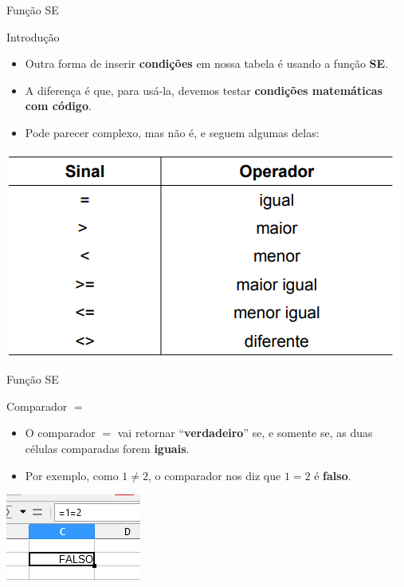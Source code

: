 \begin{frame}{Função SE}
	\begin{block}{Introdução}
		\begin{itemize}
			\item Outra forma de inserir \textbf{condições} em nossa tabela é usando a função \textbf{SE}.
			\item A diferença é que, para usá-la, devemos testar \textbf{condições matemáticas com código}.
			\item Pode parecer complexo, mas não é, e seguem algumas delas:
		\end{itemize}
	\end{block}
	
	\centering
	\includegraphics[width=0.6\linewidth]{Figuras/Ch06/fig44.12}
\end{frame}


\begin{frame}{Função SE}
	\begin{block}{Comparador $ = $}
		\begin{itemize}
			\item O comparador $ = $ vai retornar ``\textbf{verdadeiro}'' se, e somente se, as duas células comparadas forem \textbf{iguais}.
			\item Por exemplo, como $1\neq2$, o comparador nos diz que $ 1=2 $ é \textbf{falso}.
		\end{itemize}
	\end{block}
	
	\centering
	\includegraphics[width=0.6\linewidth]{Figuras/Ch06/fig44.13}
\end{frame}


